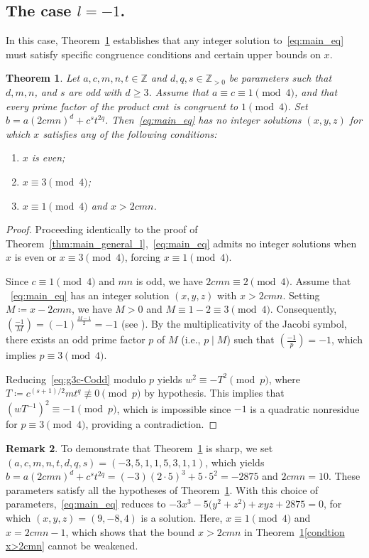 \documentclass[11pt,a4paper]{amsart}
\newcommand{\ZZ}{\mathbb{Z}}
\theoremstyle{plain}
\newtheorem{theorem}{Theorem}[section]
\theoremstyle{definition}
\newtheorem{remark}[theorem]{Remark}
\begin{document}
\subsection{The case \texorpdfstring{$l = -1$}{l = -1}.}
\label{sec:general+1c}
In this case, Theorem~\ref{thm:general-plus1} establishes that any integer solution to~\eqref{eq:main_eq} must satisfy specific congruence conditions and certain upper bounds on $x$.
\begin{theorem}\label{thm:general-plus1}
Let $a, c, m, n, t \in \ZZ$ and $d, q, s \in \ZZ_{>0}$ be parameters such that $d, m, n$, and $s$ are odd with $d\ge 3$. Assume that $a \equiv c \equiv 1 \pmod{4}$, and that every prime factor of the product $cmt$ is congruent to $1 \pmod{4}$. Set $b = a  (2c m n)^d + c^s t^{2q}$. Then~\eqref{eq:main_eq} has no integer solutions $(x,y,z)$ for which $x$ satisfies any of the following conditions:
\begin{enumerate}[label=(\alph*)]
    \item $x$ is even;
    \item $x \equiv 3 \pmod 4$;
    \item $x \equiv 1 \pmod 4$ and $x > 2cmn$. \label{condtion x>2cmn}
\end{enumerate}
\end{theorem}
\begin{proof}
Proceeding identically to the proof of Theorem~\ref{thm:main_general_l},~\eqref{eq:main_eq} admits no integer solutions when $x$ is even or $x \equiv 3 \pmod 4$, forcing $x \equiv 1 \pmod 4$. 

Since $c \equiv 1 \pmod 4$ and $mn$ is odd, we have $2cmn \equiv 2 \pmod 4$. Assume that ~\eqref{eq:main_eq} has an integer solution $(x,y,z)$ with $x>2cmn$. Setting $M \coloneqq x - 2cmn$, we have $M>0$ and $M  \equiv 1 - 2 \equiv 3 \pmod 4$. Consequently, $\left(\frac{-1}{M}\right) = (-1)^{\frac{M-1}{2}} = -1$ (see \cite[p.~192]{Burton}). By the multiplicativity of the Jacobi symbol, there exists an odd prime factor $p$ of $ M$ (i.e., $p \mid M$) such that $\left(\frac{-1}{p}\right) = -1$, which implies $p \equiv 3 \pmod 4$. 

Reducing~\eqref{eq:g3c-Codd} modulo $p$ yields $w^2 \equiv -T^2 \pmod p$, where $T \coloneqq c^{(s+1)/2} m t^q \not\equiv 0 \pmod p$ by hypothesis. This implies that $(wT^{-1})^2 \equiv -1 \pmod p$, which is impossible since $-1$ is a quadratic nonresidue for $p \equiv 3 \pmod 4$, providing a contradiction.
\end{proof}
\begin{remark}
To demonstrate that Theorem~\ref{thm:general-plus1} is sharp, we set $(a,c,m,n,t,d,q,s)=(-3,5,1,1,5,3,1,1)$, which yields $b=a(2cmn)^{d}+c^{s}t^{2q}=(-3)(2\cdot5)^{3}+5\cdot 5^{2}=-2875$ and $2cmn=10$. These parameters satisfy all the hypotheses of Theorem~\ref{thm:general-plus1}. With this choice of parameters,~\eqref{eq:main_eq} reduces to $ -3x^{3} - 5\bigl(y^{2} + z^{2}\bigr) + xyz + 2875 = 0$, for which $(x,y,z)=(9,-8,4)$ is a solution. Here, $x\equiv 1\pmod{4}$ and $x=2cmn-1$, which shows that the bound $x>2cmn$ in Theorem~\ref{thm:general-plus1}\ref{condtion x>2cmn} cannot be weakened.
\end{remark}
\end{document}
